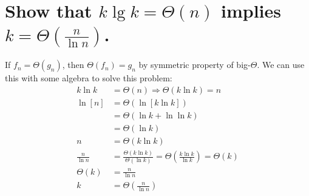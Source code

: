 \section[Problem 3]{Show that $k \lg k = \Theta(n)$ implies $k = \Theta\left(\frac{n}{\ln n}\right)$.}
If $f_n = \Theta(g_n)$, then $\Theta(f_n) = g_n$ by symmetric property of big-$\Theta$. We can use this with some algebra to solve this problem:
\begin{align*}
	k \ln k &= \Theta(n) \Longrightarrow \Theta(k \ln k) = n \\
	\ln [n] &= \Theta ( \ln [k \ln k ] ) \\
	&=
	\Theta (\ln k + \ln \ln k) \\
	&= \Theta(\ln k) \\
	n &= \Theta(k \ln k) \\
	\frac{n}{\ln n} &= \frac{\Theta(k \ln k)}{\Theta(\ln k)} = \Theta \left( \frac{k \ln k}{\ln k} \right) = \Theta(k) \\
	\Theta(k) &= \frac{n}{\ln n} \\ 
	k &= \Theta \left( \frac{n}{\ln n} \right) 
\end{align*}
